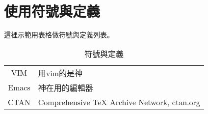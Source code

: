 \documentclass[class=NCU_thesis, crop=false]{standalone}
\begin{document}
\chapter{使用符號與定義}
這裡示範用表格做符號與定義列表。

\begin{table}[h]
	\fontsize{14}{25}\selectfont  %
	\centering
	\begin{tabular}{c@{\quad}@{：}l}
		VIM     & 用vim的是神 \\ 
		Emacs   & 神在用的編輯器 \\ 
		CTAN    & Comprehensive TeX Archive Network, ctan.org \\
		
	\end{tabular} 
	\caption{符號與定義} %
	\label{table:symbol_def}
\end{table}
\end{document}
